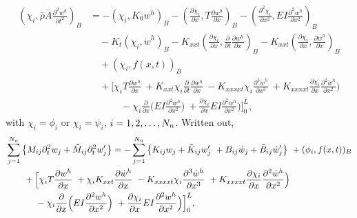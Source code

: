 \documentclass[11pt]{article}
\newcommand{\rhos}{\bar{\rho}}
\newcommand{\As}{\bar{A}}
\newcommand{\Ls}{\bar{L}}
\newcommand{\wt}{\dot{w}}
\begin{document}
\begin{align}
 \left( \chi_i,  \rhos \As \frac{\partial^2 w^h}{\partial t^2} \right)_B  &= 
                  - \left( \chi_i , K_0 w^h \right)_B
                  - \left( \frac{\partial \chi_i}{\partial x} , T \frac{\partial w^h}{\partial x} \right)_B
                  -\left(\frac{\partial^2 \chi_i}{\partial x^2}, E I \frac{\partial^2 w^h}{\partial x^2}\right)_B  \\
              &\quad   
         - K_{t} \left( \chi_i , \wt^h \right)_B
         - K_{xxt} \left( \frac{\partial \chi_i}{\partial x} , \frac{\partial}{\partial t}\frac{\partial w^h}{\partial x} \right)_B
      - K_{xxt} \left( \frac{\partial \chi_i}{\partial x} ,\frac{\partial \wt^h}{\partial x} \right)_B \\
        &\quad   + ( \chi_i, f(x,t))_B \\
             &\quad  +   \Big[ \chi_i T \frac{\partial w^h}{\partial x} 
                      ~ + K_{xxt} \chi_i \frac{\partial}{\partial t}\frac{\partial w^h}{\partial x} 
                      ~ -K_{xxxxt} \chi_i \frac{\partial^3 \wt^h}{\partial x^3} 
                      ~ + K_{xxxxt} \frac{\partial \chi_i}{\partial x}\frac{\partial^2 \wt^h}{\partial x^2}\Big)  \\
             &\qquad\quad
                      ~ -\chi_i \frac{\partial}{\partial x}\Big( E I \frac{\partial^2 w^h}{\partial x^2}\Big) 
                      ~ + \frac{\partial \chi_i}{\partial x}E I \frac{\partial^2 w^h}{\partial x^2}\Big)  
                      \Big]_0^{\Ls} ,  \label{eq:beamFEM_I}
\end{align}
with $\chi_i=\phi_i$ or $\chi_i=\psi_i$, $i=1,2,\ldots,N_n$. Written out,
\begin{align}
& \sum_{j=1}^{\Nn} \left\{ M_{ij} \partial_t^2 w_j 
                + \Mt_{ij} \partial_t^2 w'_j \right\}  = 
     - \sum_{j=1}^{\Nn} \left\{  K_{ij} w_j + \Kt_{ij} w'_j 
            ~ + B_{ij} \dot w_j + \Bt_{ij} \dot w'_j \right\} 
                  ~+ ( \phi_i, f(x,t))_B \\
             &\qquad  +   \Big[ \chi_i T \frac{\partial w^h}{\partial x} 
                      ~ + \chi_i K_{xxt} \frac{\partial \dot w^h}{\partial x} 
%
                      ~ -K_{xxxxt} \chi_i \frac{\partial^3 \wt^h}{\partial x^3} 
                      ~ + K_{xxxxt} \frac{\partial \chi_i}{\partial x}\frac{\partial^2 \wt^h}{\partial x^2}\Big) \\
%
             &\qquad\quad  ~ - \chi_i \frac{\partial}{\partial x}\Big( E I \frac{\partial^2 w^h}{\partial x^2}\Big) 
                      ~ + \frac{\partial \chi_i}{\partial x}E I \frac{\partial^2 w^h}{\partial x^2}\Big)  
                      \Big]_0^{\Ls}  ,  \label{eq:beamFEM_II}
\end{align}
\end{document}
